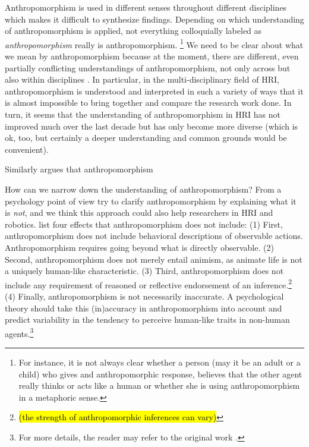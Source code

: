 \documentclass{frontiersSCNS} %
\begin{document}
Anthropomorphism is used in different senses throughout different disciplines 
\citep{duffy_anthropomorphism_2003} which makes it difficult to synthesize findings. 
Depending on which understanding of anthropomorphism is applied, not everything 
colloquially labeled as \emph{anthropomorphism} really is anthropomorphism.
\footnote{For instance, it is not always clear whether a person (may it be an adult or 
a child) who gives and anthropomorphic response, believes that the other agent really 
thinks or acts like a human or whether she is using anthropomorphism in a metaphoric 
sense.\citep{leeds_childrens_1992}} We need to be clear about what we mean by 
anthropomorphism because at the moment, there are different, even partially conflicting 
understandings of anthropomorphism, not only across but also within disciplines 
\cite{duffy_anthropomorphism_2002}. In particular, in the multi-disciplinary field of 
HRI, anthropomorphism is understood and interpreted in such a variety of ways that it 
is almost impossible to bring together and compare the research work done. In turn, it 
seems that the understanding of anthropomorphism in HRI has not improved much over the last decade but has only become more diverse (which is ok, too, but certainly a deeper 
understanding and common grounds would be convenient). 

Similarly \cite{ruijten_introducing_2014} argues that anthropomorphism 

How can we narrow down the understanding of anthropomorphism? From a psychology point of view \cite{epley_when_2008} try to clarify anthropomorphism by explaining what it is \textit{not}, and we think this approach could also help researchers in HRI and robotics. \cite{epley_when_2008} list four effects that anthropomorphism does not include:
(1) First, anthropomorphism does not include behavioral descriptions of observable actions. Anthropomorphism requires going beyond what is directly observable.
(2) Second, anthropomorphism does not merely entail animism, as animate life is not a uniquely human-like characteristic.
(3) Third, anthropomorphism does not include any requirement of reasoned or reflective endorsement of an inference.\footnote{\hl{(the strength of anthropomorphic inferences can vary)}}
(4) Finally, anthropomorphism is not necessarily inaccurate. A psychological theory should take this (in)accuracy in anthropomorphism into account and predict variability in the tendency to perceive human-like traits in non-human agents.\footnote{For more details, the reader may refer to the original work \citep{epley_when_2008}.}
\end{document}
